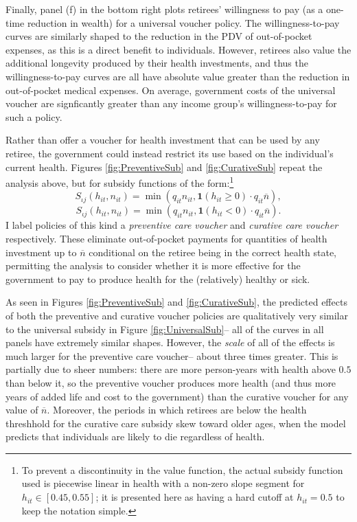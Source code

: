 \documentclass[12pt,pdftex,letterpaper]{article}
\newcommand{\Type}{\iota}
\newcommand{\Health}{h}
\newcommand{\Invst}{n}
\newcommand{\Copay}{q}
\newcommand{\Subsidy}{S}
\newcommand{\Age}{j}
\begin{document}
Finally, panel (f) in the bottom right plots retirees' willingness to pay (as a one-time reduction in wealth) for a universal voucher policy.  The willingness-to-pay curves are similarly shaped to the reduction in the PDV of out-of-pocket expenses, as this is a direct benefit to individuals.  However, retirees also value the additional longevity produced by their health investments, and thus the willingness-to-pay curves are all have absolute value greater than the reduction in out-of-pocket medical expenses.  On average, government costs of the universal voucher are signficantly greater than any income group's willingness-to-pay for such a policy.

Rather than offer a voucher for health investment that can be used by any retiree, the government could instead restrict its use based on the individual's current health.  Figures \ref{fig:PreventiveSub} and \ref{fig:CurativeSub} repeat the analysis above, but for subsidy functions of the form:\footnote{To prevent a discontinuity in the value function, the actual subsidy function used is piecewise linear in health with a non-zero slope segment for $\Health_{it} \in [0.45,0.55]$; it is presented here as having a hard cutoff at $\Health_{it}=0.5$ to keep the notation simple.}
\begin{equation}
\Subsidy_{\Type \Age}(\Health_{it},\Invst_{it})  = \min(\Copay_{it}\Invst_{it}, \textbf{1}(\Health_{it} \geq 0) \cdot \Copay_{it}\overline{\Invst}),
\end{equation}
\begin{equation}
\Subsidy_{\Type \Age}(\Health_{it},\Invst_{it})  = \min(\Copay_{it}\Invst_{it}, \textbf{1}(\Health_{it} < 0) \cdot \Copay_{it}\overline{\Invst}).
\end{equation}
I label policies of this kind a \textit{preventive care voucher} and \textit{curative care voucher} respectively.  These eliminate out-of-pocket payments for quantities of health investment up to $\overline{\Invst}$ conditional on the retiree being in the correct health state, permitting the analysis to consider whether it is more effective for the government to pay to produce health for the (relatively) healthy or sick.

As seen in Figures \ref{fig:PreventiveSub} and \ref{fig:CurativeSub}, the predicted effects of both the preventive and curative voucher policies are qualitatively very similar to the universal subsidy in Figure \ref{fig:UniversalSub}-- all of the curves in all panels have extremely similar shapes.  However, the \textit{scale} of all of the effects is much larger for the preventive care voucher-- about three times greater.   This is partially due to sheer numbers: there are more person-years with health above $0.5$ than below it, so the preventive voucher produces more health (and thus more years of added life and cost to the government) than the curative voucher for any value of $\overline{\Invst}$.  Moreover, the periods in which retirees are below the health threshhold for the curative care subsidy skew toward older ages, when the model predicts that individuals are likely to die regardless of health.
\end{document}
